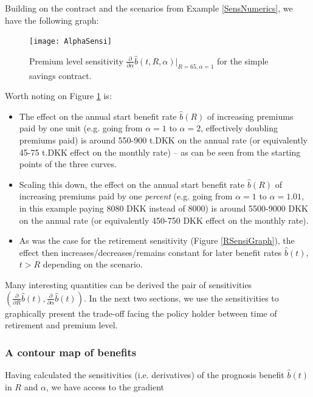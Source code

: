 \documentclass{article}
\newcommand{\1}[1]{\mathbbm{1}_{\left\lbrace #1 \right\rbrace}}
\theoremstyle{break}
\theoremstyle{remark}
\numberwithin{equation}{section}
\begin{document}
\begin{example}
	Building on the contract and the scenarios from Example \ref{SensNumerics}, we have the following graph:
	
	\begin{figure}[H] \label{AlphaSensiGraph}
		\centering
		\caption{Premium level sensitivity $\frac{\partial}{\partial \alpha} \hat{b}(t,R,\alpha)|_{R=65, \alpha=1}$ for the simple savings contract.}
		\texttt{[image: AlphaSensi]}		
	\end{figure}

Worth noting on Figure \ref{AlphaSensiGraph} is:

\begin{itemize}
	\item The effect on the annual start benefit rate $\hat{b}(R)$ of increasing premiums paid by one unit (e.g. going from $\alpha=1$ to $\alpha=2$, effectively doubling premiums paid) is around 550-900 t.DKK on the annual rate (or equivalently 45-75 t.DKK effect on the monthly rate) -- as can be seen from the starting points of the three curves.
	\item Scaling this down, the effect on the annual start benefit rate $\hat{b}(R)$ of increasing premiums paid by one \textit{percent} (e.g. going from $\alpha=1$ to $\alpha=1.01$, in this example paying 8080 DKK instead of 8000) is around 5500-9000 DKK on the annual rate (or equivalently 450-750 DKK effect on the monthly rate).
	\item As was the case for the retirement sensitivity (Figure \ref{RSensiGraph}), the effect then increases/decreases/remains constant for later benefit rates $\hat{b}(t)$, $t>R$ depending on the scenario.
\end{itemize}
\end{example}

Many interesting quantities can be derived the pair of sensitivities $(\frac{\partial}{\partial R} \hat{b}(t),\frac{\partial}{\partial \alpha} \hat{b}(t))$. In the next two sections, we use the sensitivities to graphically present the trade-off facing the policy holder between time of retirement and premium level.

\subsubsection{A contour map of benefits}

Having calculated the sensitivities (i.e. derivatives) of the prognosis benefit $\hat{b}(t)$ in $R$ and $\alpha$, we have access to the gradient
\end{document}
